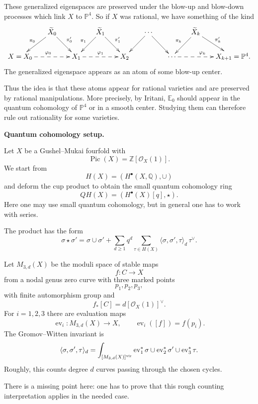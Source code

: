 These generalized eigenspaces are
preserved under the blow-up and
blow-down processes which link $X$ to
$\mathbb{P}^4$. So if $X$ was rational,
we have something of the kind
\[
\xymatrix@C=1.6em@R=1.8em{
& \widetilde X_0
\ar[dl]_{\pi_0}
\ar[dr]^{\pi'_0}
&& \widetilde X_1
\ar[dl]_{\pi_1}
\ar[dr]^{\pi'_1}
&& \cdots \ar[dr]\ar[dl]
&& \widetilde X_k
\ar[dl]_{\pi_k}
\ar[dr]^{\pi'_k}
\\
X=X_0
\ar@{-->}[rr]^{\varphi_0}
&& X_1
\ar@{-->}[rr]^{\varphi_1}
&& X_2
&& \cdots
\ar@{-->}[rr]^{\varphi_k}
&& X_{k+1}=\mathbb{P}^4 .
}
\]
The generalized eigenspace appears as
an atom of some blow-up center.

Thus the idea is that these atoms
appear for rational varieties and are
preserved by rational manipulations.
More precisely, by Iritani,
$\mathbb{E}_0$ should appear in the quantum
cohomology
of $\mathbb{P}^4$ or in a smooth center.
Studying them can therefore rule out
rationality for some varieties.

\medskip\noindent
{\bf Quantum cohomology setup.}

Let $X$ be a Gushel--Mukai fourfold
with
\[
        \operatorname{Pic}(X)=
        \mathbb{Z}[\mathcal O_X(1)].
\]
We start from
\[
        H(X)=(H^\bullet(X,\mathbb Q),
        \cup)
\]
and deform the cup product to obtain
the small quantum cohomology ring
\[
        QH(X)=(H^\bullet(X)[q],\star).
\]
Here one may use small quantum
cohomology, but in general one has to
work with series.

The product has the form
\[
        \sigma\star\sigma'
        =
        \sigma\cup\sigma'
        +
        \sum_{d\geq 1}q^d
        \sum_{\tau\in H(X)}
        \langle\sigma,\sigma',\tau
        \rangle_d\,\tau^\vee .
\]

Let $M_{3,d}(X)$ be the moduli space
of stable maps
\[
        f:C\to X
\]
from a nodal genus zero curve with
three marked points
\[
        p_1,p_2,p_3,
\]
with finite automorphism group and
\[
        f_*[C]=d[\mathcal O_X(1)]^\vee.
\]
For $i=1,2,3$ there are evaluation
maps
\[
        \operatorname{ev}_i:
        M_{3,d}(X)\to X,
        \qquad
        \operatorname{ev}_i([f])=f(p_i).
\]
The Gromov--Witten invariant is
\[
        \langle\sigma,\sigma',\tau
        \rangle_d
        =
        \int_{[M_{3,d}(X)]^{\rm vir}}
        \operatorname{ev}_1^*\sigma
        \cup
        \operatorname{ev}_2^*\sigma'
        \cup
        \operatorname{ev}_3^*\tau .
\]
Roughly, this counts degree $d$
curves passing through the chosen
cycles.

\begin{remark}
\label{remark-missing-point}
There is a missing point here: one has
to prove that this rough counting
interpretation applies in the needed
case.
\end{remark}


